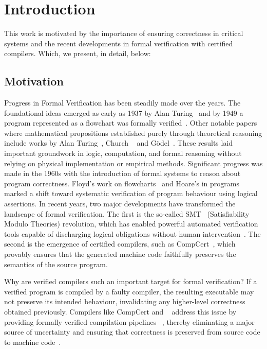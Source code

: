 
%

\chapter{Introduction}
\label{cha:introduction}

This work is motivated by the importance of ensuring correctness in critical systems and the recent developments 
in formal verification with certified compilers. Which, we present, in detail, below:

\section{Motivation}
\label{sec:Motivation}


Progress in Formal Verification has been steadily made over the years. 
The foundational ideas emerged as early as 1937 by Alan Turing~\cite{Turing37} and by 1949 a program
represented as a flowchart was formally verified~\cite{early-proof}. Other notable papers where mathematical propositions 
established purely through theoretical reasoning include works by Alan Turing~\cite{Turing38}, Church
~\cite{church-unsolvableproblemof-1936} and Gödel~\cite{ZACH2005917}. These results laid important 
groundwork in logic, computation, and formal reasoning without relying on physical implementation or empirical methods.
Significant progress was made in the 1960s with the introduction of formal systems to reason about program correctness. 
Floyd's work on flowcharts~\cite{Floyd93} and Hoare's in programs~\cite{Hoare69} marked a shift toward systematic verification of 
program behaviour using logical assertions.
In recent years, two major developments have transformed the landscape of formal verification. The first is the so-called SMT~\cite{abs-1711-10641} 
(Satisfiability Modulo Theories) revolution, which has enabled powerful automated verification tools capable of discharging 
logical obligations without human intervention~\cite{Barrett2018}. The second is the emergence of certified compilers, such as 
CompCert~\cite{Leroy09-back-end}, which provably ensures that the generated machine code faithfully preserves the semantics of the source 
program.


Why are verified compilers such an important target for formal verification? If a verified program is compiled by a 
faulty compiler, the resulting executable may not preserve its intended behaviour, invalidating any higher-level correctness
obtained previously. Compilers like CompCert and \cml~\cite{POPL14} address this issue by providing formally verified compilation pipelines
~\cite{LoowKTMNAF19, GrossEPPC22, Leroy09}, thereby eliminating a major source of uncertainty and ensuring that correctness is 
preserved from source code to machine code~\cite{LeroyCompilerMeaning}.


